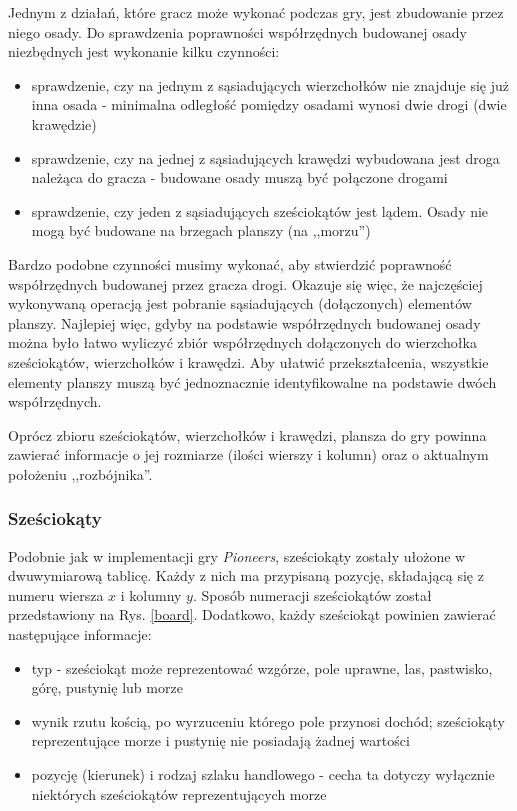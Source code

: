 \documentclass[a4paper,12pt]{article}
\providecommand{\imref}[1]{Rys. \ref{#1}} %
\begin{document}
Jednym z działań, które gracz może wykonać podczas gry, jest
zbudowanie przez niego osady. Do sprawdzenia poprawności współrzędnych
budowanej osady niezbędnych jest wykonanie kilku czynności:

\begin{itemize}
\item sprawdzenie, czy na jednym z sąsiadujących wierzchołków nie
  znajduje się już inna osada - minimalna odległość pomiędzy osadami
  wynosi dwie drogi (dwie krawędzie)
\item sprawdzenie, czy na jednej z sąsiadujących krawędzi wybudowana
  jest droga należąca do gracza - budowane osady muszą być połączone
  drogami
\item sprawdzenie, czy jeden z sąsiadujących sześciokątów jest
  lądem. Osady nie mogą być budowane na brzegach planszy (na
  ,,morzu'')
\end{itemize}

Bardzo podobne czynności musimy wykonać, aby stwierdzić poprawność
współrzędnych budowanej przez gracza drogi. Okazuje się więc, że
najczęściej wykonywaną operacją jest pobranie sąsiadujących
(dołączonych) elementów planszy. Najlepiej więc, gdyby na podstawie
współrzędnych budowanej osady można było łatwo wyliczyć zbiór
współrzędnych dołączonych do wierzchołka sześciokątów, wierzchołków i
krawędzi. Aby ułatwić przekształcenia, wszystkie elementy planszy
muszą być jednoznacznie identyfikowalne na podstawie dwóch
współrzędnych.

Oprócz zbioru sześciokątów, wierzchołków i krawędzi, plansza do gry
powinna zawierać informacje o jej rozmiarze (ilości wierszy i kolumn)
oraz o aktualnym położeniu ,,rozbójnika''.

\subsubsection{Sześciokąty}
Podobnie jak w implementacji gry \emph{Pioneers}, sześciokąty zostały
ułożone w dwuwymiarową tablicę. Każdy z nich ma przypisaną pozycję,
składającą się z numeru wiersza $x$ i kolumny $y$. Sposób numeracji
sześciokątów został przedstawiony na \imref{board}. Dodatkowo, każdy
sześciokąt powinien zawierać następujące informacje:

\begin{itemize}
\item typ - sześciokąt może reprezentować wzgórze, pole uprawne, las,
  pastwisko, górę, pustynię lub morze
\item wynik rzutu kością, po wyrzuceniu którego pole przynosi
  dochód; sześciokąty reprezentujące morze i pustynię nie posiadają
  żadnej wartości
\item pozycję (kierunek) i rodzaj szlaku handlowego - cecha ta dotyczy
  wyłącznie niektórych sześciokątów reprezentujących morze
\end{itemize}
\end{document}
